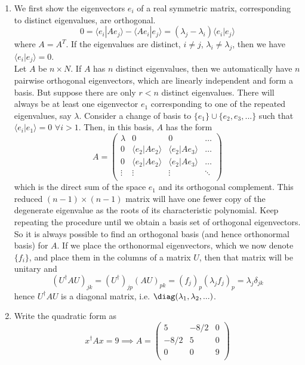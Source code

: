 \documentclass[a4paper]{article}
\begin{document}
\begin{ans}\leavevmode
\begin{enumerate}[label=(\alph*)]
\item We first show the eigenvectors $e_i$ of a real symmetric matrix, corresponding to distinct eigenvalues, are orthogonal.
$$0=\langle e_i|Ae_j\rangle-\langle Ae_i|e_j\rangle=(\lambda_j-\lambda_i)\langle e_i|e_j\rangle$$
where $A=A^T$. If the eigenvalues are distinct, $i\neq j$, $\lambda_i\neq\lambda_j$, then we have $\langle e_i|e_j\rangle=0$.\\[5pt]
Let $A$ be $n\times N$. If $A$ has $n$ distinct eigenvalues, then we automatically have $n$ pairwise orthogonal eigenvectors, which are linearly independent and form a basis. But suppose there are only $r<n$ distinct eigenvalues. There will always be at least one eigenvector $e_1$ corresponding to one of the repeated eigenvalues, say $\lambda$. Consider a change of basis to $\{e_1\}\cup\{e_2,e_3,...\}$ such that $\langle e_i|e_1\rangle=0$ $\forall i>1$. Then, in this basis, $A$ has the form
$$A=\begin{pmatrix}\lambda&0&0&\dots\\0&\langle e_2|Ae_2\rangle&\langle e_2|Ae_3\rangle&\dots\\0&\langle e_2|Ae_2\rangle&\langle e_2|Ae_3\rangle&\dots\\\vdots&\vdots&\vdots&\ddots\\\end{pmatrix}$$
which is the direct sum of the space $e_1$ and its orthogonal complement. This reduced $(n-1)\times(n-1)$ matrix will have one fewer copy of the degenerate eigenvalue as the roots of its characteristic polynomial. Keep repeating the procedure until we obtain a basis set of orthogonal eigenvectors.\\[5pt]
So it is always possible to find an orthogonal basis (and hence orthonormal basis) for $A$. If we place the orthonormal eigenvectors, which we now denote $\{f_i\}$, and place them in the columns of a matrix $U$, then that matrix will be unitary and
$$(U^\dag AU)_{jk}=(U^\dag)_{jp}(AU)_{pk}=(f_j)_p(\lambda_jf_j)_p=\lambda_j\delta_{jk}$$
hence $U^\dag AU$ is a diagonal matrix, i.e. $\diag(\lambda_1,\lambda_2,...)$.
\item Write the quadratic form as 
$$x^\dag Ax=9\implies A=\begin{pmatrix}5&-8/2&0\\-8/2&5&0\\0&0&9\\\end{pmatrix}$$

\end{enumerate}
\end{ans}
\end{document}
